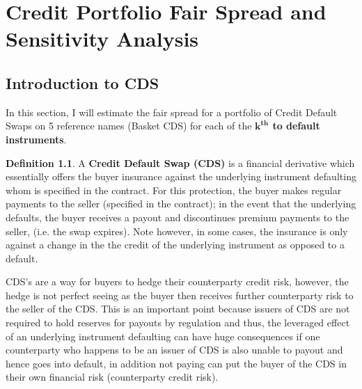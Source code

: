 \documentclass{report}
\theoremstyle{plain}
\theoremstyle{definition}
\newtheorem{defn}[thm]{Definition} %
\begin{document}














\part{Credit Portfolio Fair Spread and Sensitivity Analysis}

\chapter{Introduction to CDS}

In this section, I will estimate the fair spread for a portfolio of Credit Default Swaps on 5 reference names (Basket CDS) for each of the \textbf{$\mathbf{k^{th}}$ to default instruments}. 

\begin{defn}A \textbf{Credit Default Swap (CDS)} is a financial derivative which essentially offers the buyer insurance against the underlying instrument defaulting whom is specified in the contract. For this protection, the buyer makes regular payments to the seller (specified in the contract); in the event that the underlying defaults, the buyer receives a payout and discontinues premium payments to the seller, (i.e. the swap expires). Note however, in some cases, the insurance is only against a change in the the credit of the underlying instrument as opposed to a default.\end{defn}

CDS's are a way for buyers to hedge their counterparty credit risk, however, the hedge is not perfect seeing as the buyer then receives further counterparty risk to the seller of the CDS. This is an important point because issuers of CDS are not required to hold reserves for payouts by regulation and thus, the leveraged effect of an underlying instrument defaulting can have huge consequences if one counterparty who happens to be an issuer of CDS is also unable to payout and hence goes into default, in addition not paying can put the buyer of the CDS in their own financial risk (counterparty credit risk).\\
\end{document}
